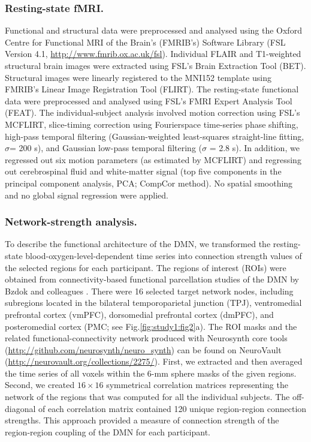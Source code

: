 \subsubsection{Resting-state fMRI.} 

Functional and structural data were preprocessed and analysed using the Oxford Centre for Functional MRI of the Brain’s (FMRIB’s) Software Library (FSL Version 4.1, \url{http://www.fmrib.ox.ac.uk/fsl}). 
Individual FLAIR and T1-weighted structural brain images were extracted using FSL’s Brain Extraction Tool (BET). Structural images were linearly registered to the MNI152 template using FMRIB’s Linear Image Registration Tool (FLIRT). The resting-state functional data were preprocessed and analysed using FSL's FMRI Expert Analysis Tool (FEAT). The individual-subject analysis involved motion correction using FSL’s MCFLIRT, slice-timing correction using Fourierspace time-series phase shifting, high-pass temporal filtering (Gaussian-weighted least-squares straight-line fitting, \(\sigma\)= 200 s), and Gaussian low-pass temporal filtering (\(\sigma\) = 2.8 s). In addition, we regressed out six motion parameters (as estimated by MCFLIRT) and regressing out cerebrospinal fluid and white-matter signal (top five components in the principal component analysis, PCA; CompCor method). No spatial smoothing and no global signal regression were applied.

\subsubsection{Network-strength analysis.} 

To describe the functional architecture of the DMN, we transformed the resting-state blood-oxygen-level-dependent time series into connection strength values of the selected regions for each participant. The regions of interest (ROIs) were obtained from connectivity-based functional parcellation studies of the DMN by Bzdok and colleagues
\cite{BzdokNI2013,Bzdok2015,Bzdok2016,Eickhoff2016,Eickhoff2016}.
There were 16 selected target network nodes, including subregions located in the bilateral temporoparietal junction (TPJ), ventromedial prefrontal cortex (vmPFC), dorsomedial prefrontal cortex (dmPFC), and posteromedial cortex 
(PMC; see Fig.\ref{fig:study1:fig2}a). 
The ROI masks and the related functional-connectivity network produced with Neurosynth core tools 
(\url{http://github.com/neurosynth/neuro_synth}) 
can be found on NeuroVault 
(\url{http://neurovault.org/collections/2275/}). First, we extracted and then averaged the time series of all voxels within the 6-mm sphere masks of the given regions. Second, we created \(16\times16\) symmetrical correlation matrices representing the network of the regions that was computed for all the individual subjects. The off-diagonal of each correlation matrix contained 120 unique region-region connection strengths. This approach provided a measure of connection strength of the region-region coupling of the DMN for each participant.

